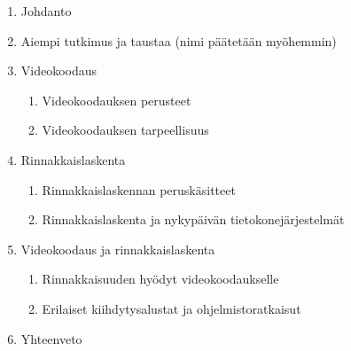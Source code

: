 \documentclass[12pt,a4paper,finnish,oneside]{article}
\begin{document}
\begin{enumerate}
	\item Johdanto
	\item Aiempi tutkimus ja taustaa (nimi päätetään myöhemmin)
	\item Videokoodaus
		\begin{enumerate}
			\item Videokoodauksen perusteet
			\item Videokoodauksen tarpeellisuus
		\end{enumerate}
	\item Rinnakkaislaskenta
		\begin{enumerate}
			\item Rinnakkaislaskennan peruskäsitteet
			\item Rinnakkaislaskenta ja nykypäivän tietokonejärjestelmät
		\end{enumerate}
	\item Videokoodaus ja rinnakkaislaskenta
		\begin{enumerate}
			\item Rinnakkaisuuden hyödyt videokoodaukselle
			\item Erilaiset kiihdytysalustat ja ohjelmistoratkaisut
		\end{enumerate}
	\item{Yhteenveto}
\end{enumerate}

%


% 

\renewcommand{\refname}{Lähteet}  %



\end{document}
